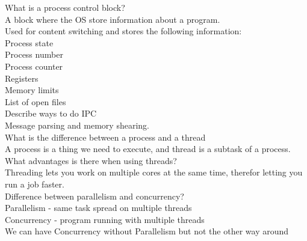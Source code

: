 \documentclass[a4paper,10pt,titlepage]{report}
\begin{document}
What is a process control block?\\
\hspace{10mm}A block where the OS store information about a program.\\ 
\hspace{10mm}Used for content switching and stores the following information:\\
\hspace{20mm}Process state\\
\hspace{20mm}Process number\\
\hspace{20mm}Process counter\\
\hspace{20mm}Registers\\
\hspace{20mm}Memory limits\\
\hspace{20mm}List of open files\\


\vspace{5mm}
Describe ways to do IPC\\
\hspace{10mm}Message parsing and memory shearing. \\




\vspace{5mm}
What is the difference between a process and a thread\\
\hspace{10mm}A process is a thing we need to execute, and thread is a subtask of a process.\\


\vspace{5mm}
What advantages is there when using threads?\\
\hspace{10mm}Threading lets you work on multiple cores at the same time, therefor letting you run a job faster.\\


\vspace{5mm}
Difference between parallelism and concurrency?\\

\hspace{10mm}	Parallelism - same task spread on multiple threads\\
\hspace{10mm}	Concurrency - program running with multiple threads\\
\hspace{10mm}  	We can have Concurrency without Parallelism but not the other way around\\
\end{document}
